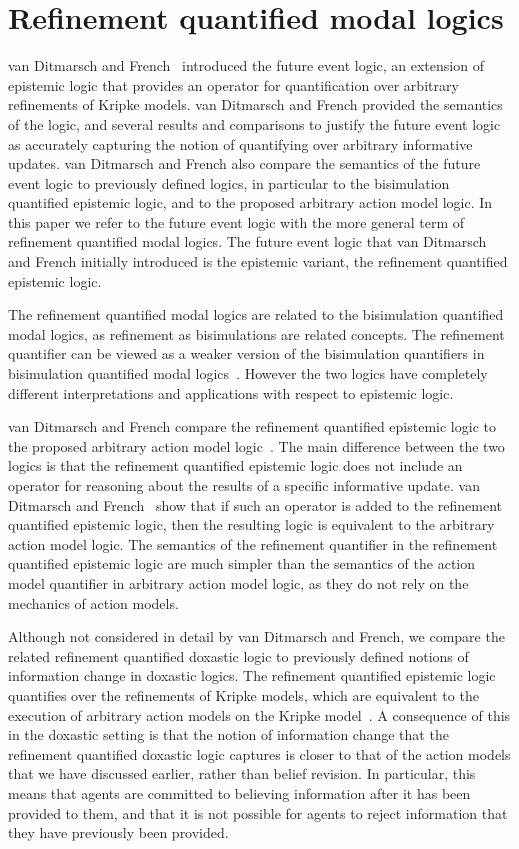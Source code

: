 \section{Refinement quantified modal logics}

van Ditmarsch and French~\cite{french2009simulation} introduced the future event
logic, an extension of epistemic logic that provides an operator for
quantification over arbitrary refinements of Kripke models. van Ditmarsch and
French provided the semantics of the logic, and several results and comparisons
to justify the future event logic as accurately capturing the notion of
quantifying over arbitrary informative updates. van Ditmarsch and French also
compare the semantics of the future event logic to previously defined logics, in
particular to the bisimulation quantified epistemic logic, and to the proposed
arbitrary action model logic. In this paper we refer to the future event logic
with the more general term of refinement quantified modal logics. The future
event logic that van Ditmarsch and French initially introduced is the epistemic
variant, the refinement quantified epistemic logic.

The refinement quantified modal logics are related to the bisimulation
quantified modal logics, as refinement as bisimulations are related concepts.
The refinement quantifier can be viewed as a weaker version of the bisimulation
quantifiers in bisimulation quantified modal logics~\cite{french2009simulation}.
However the two logics have completely different interpretations and
applications with respect to epistemic logic.

van Ditmarsch and French compare the refinement quantified epistemic logic to
the proposed arbitrary action model logic~\cite{french2009simulation}. The main
difference between the two logics is that the refinement quantified epistemic
logic does not include an operator for reasoning about the results of a specific
informative update. van Ditmarsch and French~\cite{french2009simulation} show
that if such an operator is added to the refinement quantified epistemic logic,
then the resulting logic is equivalent to the arbitrary action model logic. The
semantics of the refinement quantifier in the refinement quantified epistemic
logic are much simpler than the semantics of the action model quantifier in
arbitrary action model logic, as they do not rely on the mechanics of action
models.

Although not considered in detail by van Ditmarsch and French, we compare the
related refinement quantified doxastic logic to previously defined notions of
information change in doxastic logics. The refinement quantified epistemic logic
quantifies over the refinements of Kripke models, which are equivalent to the
execution of arbitrary action models on the Kripke
model~\cite{french2009simulation}. A consequence of this in the doxastic setting
is that the notion of information change that the refinement quantified doxastic
logic captures is closer to that of the action models that we have discussed
earlier, rather than belief revision. In particular, this means that agents are
committed to believing information after it has been provided to them, and that
it is not possible for agents to reject information that they have previously
been provided.

